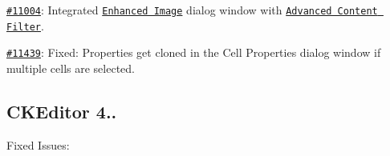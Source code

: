 {\begin{DoxyItemize}
\item \href{http://dev.ckeditor.com/ticket/11004}{\tt \#11004}\+: Integrated \href{http://ckeditor.com/addon/image2}{\tt Enhanced Image} dialog window with \href{http://docs.ckeditor.com/#!/guide/dev_advanced_content_filter}{\tt Advanced Content Filter}.
\item \href{http://dev.ckeditor.com/ticket/11439}{\tt \#11439}\+: Fixed\+: Properties get cloned in the Cell Properties dialog window if multiple cells are selected.
\end{DoxyItemize}}

{\ttfamily \subsection*{C\+K\+Editor 4..}}

{\ttfamily }

{\ttfamily Fixed Issues\+:}


